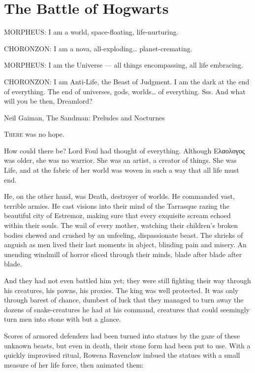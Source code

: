 \chapter{The Battle of Hogwarts}

MORPHEUS: I am a world, space-floating, life-nurturing.

CHORONZON: I am a nova, all-exploding… planet-cremating.

MORPHEUS: I am the Universe — all things encompassing, all life embracing.  

CHORONZON: I am Anti-Life, the Beast of Judgment. I am the dark at the end of everything. The end of universes, gods, worlds… of everything. Sss. And what will you be then, Dreamlord? 

Neil Gaiman, The Sandman: Preludes and Nocturnes

\simpleline


\lettrine{T}{here} was no hope.

How could there be? Lord Foul had thought of everything. Although Ελαολογος was older, she was no warrior. She was an artist, a creator of things. She was Life, and at the fabric of her world was woven in such a way that all life must end.

He, on the other hand, was Death, destroyer of worlds. He commanded vast, terrible armies. He cast visions into their mind of the Tarrasque razing the beautiful city of Estremoz, making sure that every exquisite scream echoed within their souls. The wail of every mother, watching their children’s broken bodies chewed and crushed by an unfeeling, dispassionate beast. The shrieks of anguish as men lived their last moments in abject, blinding pain and misery. An unending windmill of horror sliced through their minds, blade after blade after blade.

And they had not even battled him yet; they were still fighting their way through his creatures, his pawns, his proxies. The king was well protected. It was only through barest of chance, dumbest of luck that they managed to turn away the dozens of snake-creatures he had at his command, creatures that could seemingly turn men into stone with but a glance.

Scores of armored defenders had been turned into statues by the gaze of these unknown beasts, but even in death, their stone form had been put to use. With a quickly improvised ritual, Rowena Ravenclaw imbued the statues with a small measure of her life force, then animated them:

